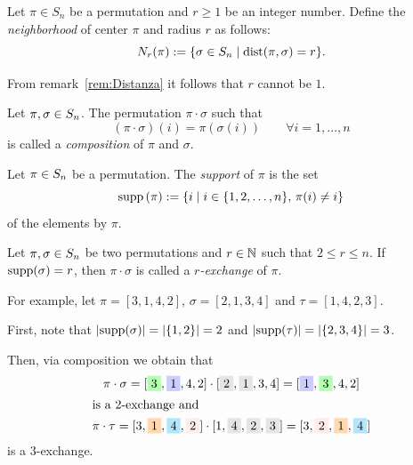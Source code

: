\begin{defi}
	\label{def:Intorno}
	Let $\pi \in  S_n$ be a permutation and $r \ge 1$ be  an integer number.
Define the \textit{neighborhood} of center $\pi$ and radius $r$  as follows:
	\[
	N_{r}(\pi):=\{\sigma \in  S_n \mid \operatorname{dist}(\pi,\sigma)=r\}.
	\]	
\end{defi}
\begin{oss}
	From remark~\ref{rem:Distanza} it follows that $r$ cannot be $1$.
\end{oss}

\begin{defi}
	Let $\pi,\sigma \in S_n$. The permutation $\pi \cdot \sigma$ such that
	\[
	\left(\pi \cdot \sigma \right)(i) = \pi \left( \sigma (i) \right) \qquad \forall i=1,\dots,n
	\]
is called a \textit{composition} of $\pi$ and $\sigma$.
\end{defi}

\begin{defi}
Let $\pi \in S_n$ be a permutation. The \textit{support} of $\pi$ is the set
\[
\operatorname{supp}{(\pi)} := \left\{i \mid i\in\{1,2,\dots,n\}, \, \pi(i) \neq i\right\}
\] 
of the elements  by $\pi$.
\end{defi}


\begin{defi}[$r$-exchange] 
Let $\pi,\sigma\in S_n$ be two permutations and $r\in \mathbb{N}$ such that $2 \le r \le n$. If $\operatorname{supp}(\sigma) = r$, then $\pi \cdot \sigma$ is called a \textit{$r$-exchange} of $\pi$.
\end{defi}

For example, let $\pi=[3,1,4,2]$, $\sigma =[2,1,3,4]$ and $\tau=[1,4,2,3]$.

First, note that $\lvert\operatorname{supp}(\sigma)\rvert=\lvert\{1,2\}\rvert=2$ and $\lvert\operatorname{supp}(\tau)\rvert=\lvert\{2,3,4\}\rvert=3$. 

Then, via composition we obtain that 
\begin{gather*}
\pi \cdot \sigma  = [\colorbox{green!30}{$3$},\colorbox{blue!20}{$1$},4,2]
 \cdot [\colorbox{gray!20}{$2$},\colorbox{gray!20}{$1$},3,4] =  [\colorbox{blue!20}{$1$},\colorbox{green!30}{$3$},4,2]\\
\intertext{is a $2$-exchange and}
\pi \cdot \tau = [3,\colorbox{orange!30}{$1$},\colorbox{cyan!30}{$4$},\colorbox{pink!30}{$2$}] \cdot [1,\colorbox{gray!20}{$4$},\colorbox{gray!20}{$2$},\colorbox{gray!20}{$3$}]= [3,\colorbox{pink!30}{$2$},\colorbox{orange!30}{$1$},\colorbox{cyan!30}{$4$}]
\end{gather*}
is a $3$-exchange.


